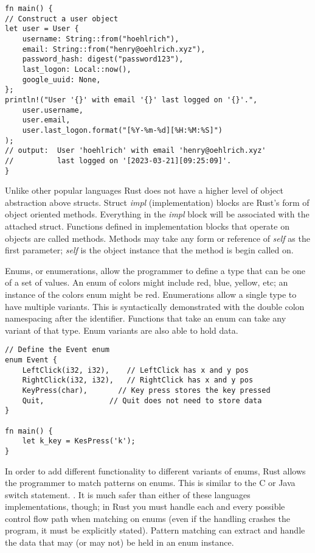 \documentclass[12pt]{article}
\begin{document}
\begin{flushleft}
\begin{verbatim}
fn main() {
// Construct a user object
let user = User {
    username: String::from("hoehlrich"),
    email: String::from("henry@oehlrich.xyz"),
    password_hash: digest("password123"),
    last_logon: Local::now(),
    google_uuid: None,
};
println!("User '{}' with email '{}' last logged on '{}'.",
    user.username,
    user.email,
    user.last_logon.format("[%Y-%m-%d][%H:%M:%S]")
);
// output:  User 'hoehlrich' with email 'henry@oehlrich.xyz'
//          last logged on '[2023-03-21][09:25:09]'.
}
\end{verbatim}
\doublespacing{}

Unlike other popular languages Rust does not have a higher level of object
abstraction above structs. Struct \textit{impl} (implementation) blocks are
Rust's form of object oriented methods. Everything in the \textit{impl} block
will be associated with the attached struct. Functions defined in
implementation blocks that operate on objects are called methods. Methods may
take any form or reference of \textit{self} as the first parameter;
\textit{self} is the object instance that the method is begin called on.

Enums, or enumerations, allow the programmer to define a type that can be one
of a set of values. An enum of colors might include red, blue, yellow, etc; an
instance of the colors enum might be red. Enumerations allow a single type to
have multiple variants. This is syntactically demonstrated with the double
colon namespacing after the identifier. Functions that take an enum can take
any variant of that type. Enum variants are also able to hold data.

\singlespacing{}
\begin{verbatim}
// Define the Event enum
enum Event {
    LeftClick(i32, i32),    // LeftClick has x and y pos
    RightClick(i32, i32),   // RightClick has x and y pos
    KeyPress(char),       // Key press stores the key pressed
    Quit,               // Quit does not need to store data
}

fn main() {
    let k_key = KesPress('k');
}
\end{verbatim}
\doublespacing{}

In order to add different functionality to different variants of enums, Rust
allows the programmer to match patterns on enums. This is similar to the C or
Java switch statement. \textit{\cite{the-c-programming-language}}. It is much safer than
either of these languages implementations, though; in Rust you must handle each
and every possible control flow path when matching on enums (even if the
handling crashes the program, it must be explicitly stated). Pattern matching
can extract and handle the data that may (or may not) be held in an enum
instance.


\end{flushleft}
\end{document}
